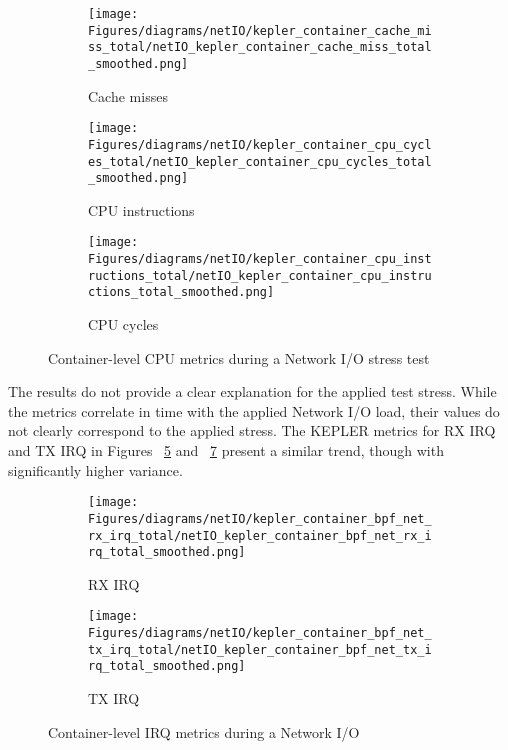 \begin{figure}[H]
    \centering
    \begin{subfigure}{1\textwidth}
        \texttt{[image: Figures/diagrams/netIO/kepler\_container\_cache\_miss\_total/netIO\_kepler\_container\_cache\_miss\_total\_smoothed.png]}
        \caption{Cache misses}
        \label{fig:netIO_kepler_container_cache_miss_total}
    \end{subfigure}
    \begin{subfigure}{0.49\textwidth}
        \texttt{[image: Figures/diagrams/netIO/kepler\_container\_cpu\_cycles\_total/netIO\_kepler\_container\_cpu\_cycles\_total\_smoothed.png]}
        \caption{CPU instructions}
        \label{fig:netIO_kepler_container_cpu_cycles_total}
    \end{subfigure}
    \begin{subfigure}{0.49\textwidth}
        \texttt{[image: Figures/diagrams/netIO/kepler\_container\_cpu\_instructions\_total/netIO\_kepler\_container\_cpu\_instructions\_total\_smoothed.png]}
        \caption{CPU cycles}
        \label{fig:netIO_kepler_container_cpu_instructions_total}
    \end{subfigure}
    \caption{Container-level CPU metrics during a Network I/O stress test}
\end{figure}

The results do not provide a clear explanation for the applied test stress. While the metrics correlate in time with the applied Network I/O load, their values do not clearly correspond to the applied stress.
The KEPLER metrics for RX IRQ and TX IRQ in Figures ~\ref{fig:netIO_kepler_container_bpf_net_rx_irq_total} and ~\ref{fig:netIO_kepler_container_bpf_net_tx_irq_total} present a similar trend, though with significantly higher variance.

\begin{figure}[H]
    \centering
    \begin{subfigure}{0.49\textwidth}
        \texttt{[image: Figures/diagrams/netIO/kepler\_container\_bpf\_net\_rx\_irq\_total/netIO\_kepler\_container\_bpf\_net\_rx\_irq\_total\_smoothed.png]}
        \caption{RX IRQ}
        \label{fig:netIO_kepler_container_bpf_net_rx_irq_total}
    \end{subfigure}
    \begin{subfigure}{0.49\textwidth}
        \texttt{[image: Figures/diagrams/netIO/kepler\_container\_bpf\_net\_tx\_irq\_total/netIO\_kepler\_container\_bpf\_net\_tx\_irq\_total\_smoothed.png]}
        \caption{TX IRQ}
        \label{fig:netIO_kepler_container_bpf_net_tx_irq_total}
    \end{subfigure}
    \caption{Container-level IRQ metrics during a Network I/O}
\end{figure}


